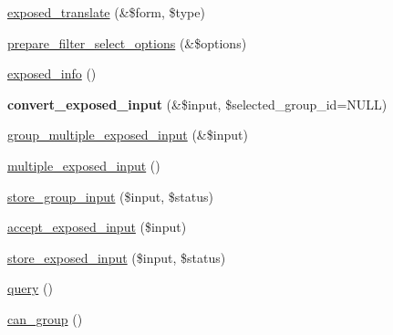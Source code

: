 \begin{DoxyCompactItemize}
\item 
\hyperlink{classviews__handler__filter_a08e8d0f9aa1a45ee427f1a8ec63fca91}{exposed\_\-translate} (\&\$form, \$type)
\item 
\hyperlink{classviews__handler__filter_a818702497fa12bbcbeaac3403337f924}{prepare\_\-filter\_\-select\_\-options} (\&\$options)
\item 
\hyperlink{classviews__handler__filter_a5405764212dfafae60fa032c217461b4}{exposed\_\-info} ()
\item 
\hypertarget{classviews__handler__filter_a7dcb50382ed1b7e96e296864309a5302}{
{\bfseries convert\_\-exposed\_\-input} (\&\$input, \$selected\_\-group\_\-id=NULL)}
\label{classviews__handler__filter_a7dcb50382ed1b7e96e296864309a5302}

\item 
\hyperlink{classviews__handler__filter_ac3d1e34084f50693c6065f1d4eac8361}{group\_\-multiple\_\-exposed\_\-input} (\&\$input)
\item 
\hyperlink{classviews__handler__filter_a27b938e318eb0a311480f8d7a684e426}{multiple\_\-exposed\_\-input} ()
\item 
\hyperlink{classviews__handler__filter_a27f90796f2b6083c4f0dbbb92a65dc7c}{store\_\-group\_\-input} (\$input, \$status)
\item 
\hyperlink{classviews__handler__filter_a88ccd2ef359009614abb48fb83c2a738}{accept\_\-exposed\_\-input} (\$input)
\item 
\hyperlink{classviews__handler__filter_a7ad1d1cd56293ca452be9e7d5cfd8b94}{store\_\-exposed\_\-input} (\$input, \$status)
\item 
\hyperlink{classviews__handler__filter_a8e513b3abbc2559f37b550ca4957b4ae}{query} ()
\item 
\hyperlink{classviews__handler__filter_a34aea08dca7f859afaff0f66610724bd}{can\_\-group} ()
\end{DoxyCompactItemize}
